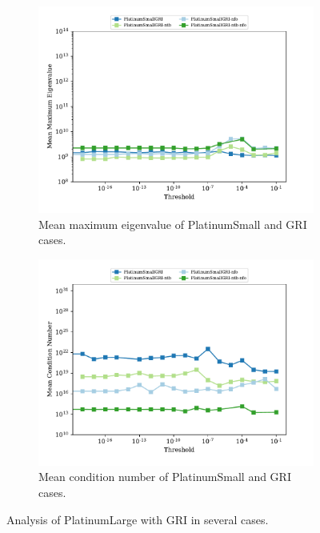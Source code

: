 \documentclass{article}
\begin{document}
\begin{figure}[htb]
    \begin{subfigure}{0.49\textwidth}
        \centering
        \includegraphics[width=\textwidth]{figures/max_eigen_gri_small.pdf}
        \caption{Mean maximum eigenvalue of PlatinumSmall and GRI cases.}
        \label{fig:gri_small_me}
    \end{subfigure}
    \hfill
    \begin{subfigure}{0.49\textwidth}
        \centering
        \includegraphics[width=\textwidth]{figures/condition_gri_small.pdf}
        \caption{Mean condition number of PlatinumSmall and GRI cases.}
        \label{fig:gri_small_iters}
    \end{subfigure}
    \hfill
    \caption{Analysis of PlatinumLarge with GRI in several cases.}
    \label{fig:gri_small}
\end{figure}
\end{document}
